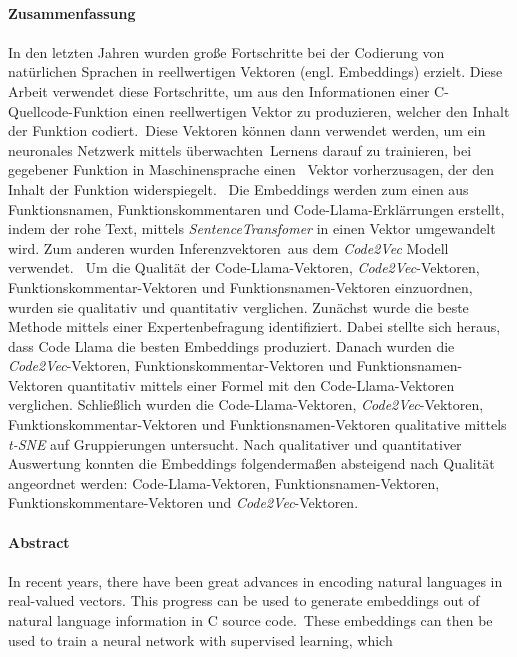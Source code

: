 \documentclass[12pt,letterpaper,ngerman]{article}
\begin{document}
\vspace{1,5cm}
\newpage \hfill\\
{\bf \Large Zusammenfassung}\\\\
In den letzten Jahren wurden große Fortschritte bei der Codierung von 
natürlichen Sprachen in reellwertigen Vektoren (engl. Embeddings) erzielt.
Diese Arbeit verwendet diese Fortschritte, um aus den Informationen 
einer C-Quellcode-Funktion einen reellwertigen Vektor zu produzieren,
welcher den Inhalt der Funktion codiert. Diese Vektoren können dann 
verwendet werden, um ein neuronales Netzwerk mittels überwachten Lernens 
darauf zu trainieren, bei gegebener Funktion in Maschinensprache einen 
Vektor vorherzusagen, der den Inhalt der Funktion widerspiegelt. 
Die Embeddings werden zum einen aus Funktionsnamen, Funktionskommentaren 
und Code-Llama-Erklärrungen \cite{rozière2024codellamaopenfoundation} 
erstellt, indem der rohe Text, mittels \textit{SentenceTransfomer} 
\cite{reimers-2019-sentence-bert} in einen Vektor umgewandelt wird.
Zum anderen wurden Inferenzvektoren aus dem 
\textit{Code2Vec} \cite{code2vec} Modell verwendet.  
Um die Qualität der Code-Llama-Vektoren, \textit{Code2Vec}-Vektoren, 
Funktionskommentar-Vektoren und Funktionsnamen-Vektoren einzuordnen,
wurden sie qualitativ und quantitativ verglichen. Zunächst wurde die 
beste Methode mittels einer Expertenbefragung identifiziert.  
Dabei stellte sich heraus, dass Code Llama die besten Embeddings 
produziert. Danach wurden die \textit{Code2Vec}-Vektoren, 
Funktionskommentar-Vektoren und Funktionsnamen-Vektoren quantitativ 
mittels einer Formel mit den Code-Llama-Vektoren verglichen. 
Schließlich wurden die Code-Llama-Vektoren, \textit{Code2Vec}-Vektoren,
Funktionskommentar-Vektoren und Funktionsnamen-Vektoren qualitative 
mittels \textit{t-SNE} auf Gruppierungen untersucht. Nach qualitativer 
und quantitativer Auswertung konnten die Embeddings 
folgendermaßen absteigend nach Qualität angeordnet werden:
Code-Llama-Vektoren, Funktionsnamen-Vektoren, 
Funktionskommentare-Vektoren und \textit{Code2Vec}-Vektoren.
\\\\
{\bf \Large Abstract}\\\\
In recent years, there have been great advances in encoding 
natural languages in real-valued vectors. This  progress can
be used to generate embeddings out of natural language 
information in C source code. These embeddings can then be 
used to train a neural network with supervised learning, which 
\end{document}
